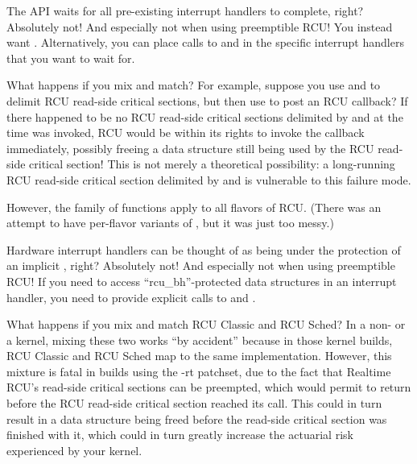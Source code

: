 \begin{enumerate}
\QuickQ{}
	The  API waits for all pre-existing
	interrupt handlers to complete, right?
\QuickA{}
	Absolutely not!
	And especially not when using preemptible RCU!
	You instead want .
	Alternatively, you can place calls to 
	and  in the specific interrupt handlers that
	you want  to wait for.

\QuickQ{}
	What happens if you mix and match?
	For example, suppose you use  and
	 to delimit RCU read-side critical
	sections, but then use  to post an
	RCU callback?
\QuickA{}
	If there happened to be no RCU read-side critical
	sections delimited by  and
	 at the time 
	was invoked, RCU would be within its rights to invoke the callback
	immediately, possibly freeing a data structure still being used by
	the RCU read-side critical section!
	This is not merely a theoretical possibility: a long-running RCU
	read-side critical section delimited by 
	and  is vulnerable to this failure mode.

	However, the  family of functions apply
	to all flavors of RCU.
	(There was an attempt to have per-flavor variants of
	, but it was just too messy.)

\QuickQ{}
	Hardware interrupt handlers can be thought of as being
	under the protection of an implicit ,
	right?
\QuickA{}
	Absolutely not!
	And especially not when using preemptible RCU!
	If you need to access ``rcu\_bh''-protected data structures
	in an interrupt handler, you need to provide explicit calls to
	 and .

\QuickQ{}
	What happens if you mix and match RCU Classic and RCU Sched?
\QuickA{}
	In a non- or a  kernel, mixing these
	two works ``by accident'' because in those kernel builds, RCU Classic
	and RCU Sched map to the same implementation.
	However, this mixture is fatal in  builds using the -rt
	patchset, due to the fact that Realtime RCU's read-side critical
	sections can be preempted, which would permit
	 to return before the
	RCU read-side critical section reached its 
	call.
	This could in turn result in a data structure being freed before the
	read-side critical section was finished with it,
	which could in turn greatly increase the actuarial risk experienced
	by your kernel.


\end{enumerate}
